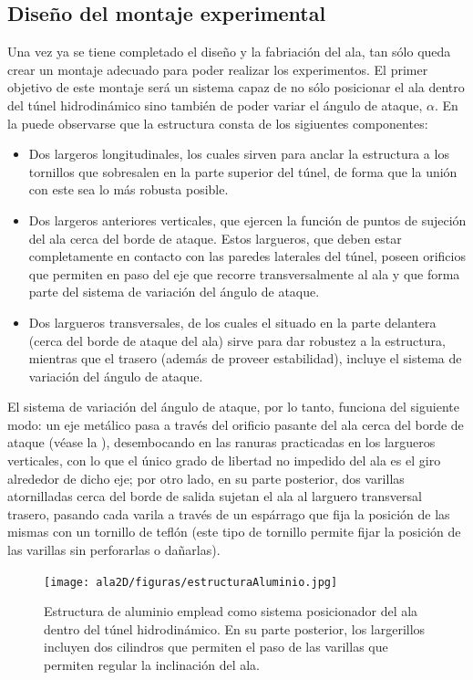 \subsection{Diseño del montaje experimental}

Una vez ya se tiene completado el diseño y la fabriación del ala, tan sólo queda crear un montaje adecuado para poder realizar los experimentos. El primer objetivo de este montaje será un sistema capaz de no sólo posicionar el ala dentro del túnel hidrodinámico sino también de poder variar el ángulo de ataque, $\alpha$. En la  puede observarse que la estructura consta de los sigiuentes componentes:

\begin{itemize}
\item Dos largeros longitudinales, los cuales sirven para anclar la estructura a los tornillos que sobresalen en la parte superior del túnel, de forma que la unión con este sea lo más robusta posible. 
\item Dos largeros anteriores verticales, que ejercen  la función de puntos de sujeción del ala cerca del borde de ataque. Estos largueros, que deben estar completamente en contacto con las paredes laterales del túnel,  poseen orificios que permiten en paso del eje que recorre transversalmente al ala y que forma parte del sistema de variación del ángulo de ataque.
\item Dos largueros transversales, de los cuales el situado en la parte delantera (cerca del borde de ataque del ala) sirve para dar robustez a la estructura, mientras que el trasero (además de proveer estabilidad), incluye el sistema de variación del ángulo de ataque.
\end{itemize}


El sistema de variación del ángulo de ataque, por lo tanto, funciona del siguiente modo: un eje metálico  pasa a través del orificio pasante del ala cerca del borde de ataque (véase la ), desembocando en las ranuras practicadas en los largueros verticales, con lo que el único grado de libertad no impedido del ala es el giro alrededor de dicho eje; por otro lado, en su parte posterior, dos varillas atornilladas cerca del borde de salida sujetan el ala al larguero transversal trasero, pasando cada varila a través de un espárrago que fija la posición de las mismas con un tornillo de teflón (este tipo de tornillo permite fijar la posición de las varillas sin perforarlas o dañarlas). 


\begin{figure}
\centering
\texttt{[image: ala2D/figuras/estructuraAluminio.jpg]}
\caption{Estructura de aluminio emplead como sistema posicionador del ala dentro del túnel hidrodinámico. En su parte posterior, los largerillos incluyen dos cilindros que permiten el paso de las varillas que permiten regular la inclinación del ala.}
\end{figure}


